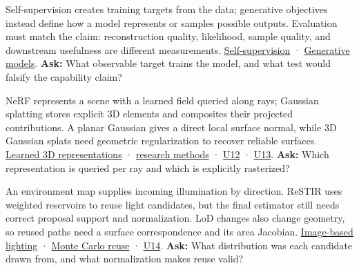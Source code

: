 Self-supervision creates training targets from the data; generative objectives instead define how a model represents or samples possible outputs. Evaluation must match the claim: reconstruction quality, likelihood, sample quality, and downstream usefulness are different measurements. \href{Continuous\%20Notes/University\%20-\%20Worlds,\%20Images\%20and\%20Inference\%20-\%20Graphics,\%20Vision\%20and\%20Photography\#Self-supervision\%20and\%20evaluation}{Self-supervision} · \href{Continuous\%20Notes/University\%20-\%20Worlds,\%20Images\%20and\%20Inference\%20-\%20Graphics,\%20Vision\%20and\%20Photography\#Generative\%20models\%20learn\%20distributions\%20and\%20samplers}{Generative models}. \textbf{Ask:} What observable target trains the model, and what test would falsify the capability claim?

NeRF represents a scene with a learned field queried along rays; Gaussian splatting stores explicit 3D elements and composites their projected contributions. A planar Gaussian gives a direct local surface normal, while 3D Gaussian splats need geometric regularization to recover reliable surfaces. \href{Continuous\%20Notes/University\%20-\%20Worlds,\%20Images\%20and\%20Inference\%20-\%20Graphics,\%20Vision\%20and\%20Photography\#Learned\%20representations\%20of\%203D\%20shape\%20and\%20scenes}{Learned 3D representations} · \href{Continuous\%20Notes/University\%20-\%20Worlds,\%20Images\%20and\%20Inference\%20-\%20Graphics,\%20Vision\%20and\%20Photography\#From\%20scene\%20representations\%20to\%20research\%20methods}{research methods} · \href{Continuous\%20Notes/University\%20-\%20Worlds,\%20Images\%20and\%20Inference\%20-\%20Graphics,\%20Vision\%20and\%20Photography\#Figure\%20U12\%20-\%20Volume\%20compositing\%20accumulates\%20visible\%20contributions}{U12} · \href{Continuous\%20Notes/University\%20-\%20Worlds,\%20Images\%20and\%20Inference\%20-\%20Graphics,\%20Vision\%20and\%20Photography\#Figure\%20U13\%20-\%20A\%20local\%20Gaussian\%20covariance\%20projects\%20to\%20an\%20ellipse}{U13}. \textbf{Ask:} Which representation is queried per ray and which is explicitly rasterized?

An environment map supplies incoming illumination by direction. ReSTIR uses weighted reservoirs to reuse light candidates, but the final estimator still needs correct proposal support and normalization. LoD changes also change geometry, so reused paths need a surface correspondence and its area Jacobian. \href{Continuous\%20Notes/University\%20-\%20Worlds,\%20Images\%20and\%20Inference\%20-\%20Graphics,\%20Vision\%20and\%20Photography\#Light\%20measurement\%20and\%20radiometry}{Image-based lighting} · \href{Continuous\%20Notes/University\%20-\%20Worlds,\%20Images\%20and\%20Inference\%20-\%20Graphics,\%20Vision\%20and\%20Photography\#Numerical\%20integration\%20and\%20Monte\%20Carlo\%20estimation}{Monte Carlo reuse} · \href{Continuous\%20Notes/University\%20-\%20Worlds,\%20Images\%20and\%20Inference\%20-\%20Graphics,\%20Vision\%20and\%20Photography\#Figure\%20U14\%20-\%20A\%20reservoir\%20selects\%20a\%20candidate\%20by\%20its\%20weight}{U14}. \textbf{Ask:} What distribution was each candidate drawn from, and what normalization makes reuse valid?

